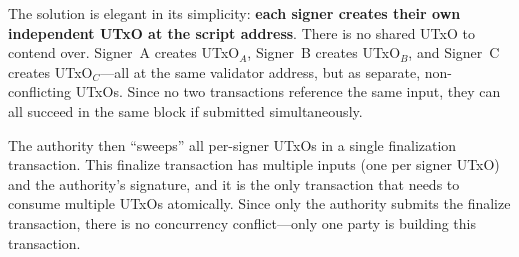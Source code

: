 The solution is elegant in its simplicity: \textbf{each signer creates their
own independent UTxO at the script address}.  There is no shared UTxO to
contend over.  Signer~A creates UTxO$_A$, Signer~B creates UTxO$_B$, and
Signer~C creates UTxO$_C$---all at the same validator address, but as
separate, non-conflicting UTxOs.  Since no two transactions reference the
same input, they can all succeed in the same block if submitted
simultaneously.

The authority then ``sweeps'' all per-signer UTxOs in a single finalization
transaction.  This finalize transaction has multiple inputs (one per signer
UTxO) and the authority's signature, and it is the only transaction that
needs to consume multiple UTxOs atomically.  Since only the authority submits
the finalize transaction, there is no concurrency conflict---only one party
is building this transaction.

